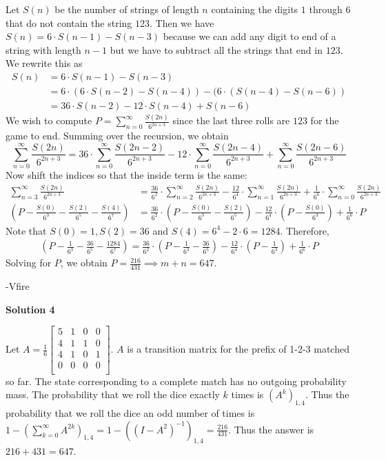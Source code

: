 \begin{enumerate}
Let $S(n)$ be the number of strings of length $n$ containing the digits $1$ through $6$ that do not contain the string $123$. Then we have $S(n) = 6 \cdot S(n-1) - S(n-3)$ because we can add any digit to end of a string with length $n-1$ but we have to subtract all the strings that end in $123$. We rewrite this as
 \begin{align*} S(n) &= 6 \cdot S(n-1) - S(n-3) \\ &= 6 \cdot (6 \cdot S(n-2) - S(n-4)) - (6 \cdot (S(n-4) - S(n-6)) \\ &= 36 \cdot S(n-2) - 12 \cdot S(n-4) + S(n-6) \end{align*}
 We wish to compute $P=\sum_{n=0}^\infty \frac{S(2n)}{6^{2n+3}}$ since the last three rolls are $123$ for the game to end. Summing over the recursion, we obtain
 \[\sum_{n=0}^\infty \frac{S(2n)}{6^{2n+3}} =36 \cdot \sum_{n=0}^\infty \frac{S(2n-2)}{6^{2n+3}} - 12 \cdot  \sum_{n=0}^\infty \frac{S(2n-4)}{6^{2n+3}}+ \sum_{n=0}^\infty \frac{S(2n-6)}{6^{2n+3}}\]Now shift the indices so that the inside term is the same:
 \begin{align*} \sum_{n=3}^\infty  \frac{S(2n)}{6^{2n+3}} &= \frac{36}{6^2} \cdot \sum_{n=2}^\infty \frac{S(2n)}{6^{2n+3}} - \frac{12}{6^4} \cdot \sum_{n=1}^\infty \frac{S(2n)}{6^{2n+3}} + \frac{1}{6^6} \cdot \sum_{n=0}^\infty \frac{S(2n)}{6^{2n+3}}  \\  \left(P - \frac{S(0)}{6^3} -  \frac{S(2)}{6^5} -\frac{S(4)}{6^7}  \right) &= \frac{36}{6^2} \cdot \left( P -   \frac{S(0)}{6^3} -  \frac{S(2)}{6^5}\right) - \frac{12}{6^4} \cdot \left(  P - \frac{S(0)}{6^3} \right) + \frac{1}{6^6} \cdot P  \end{align*}
Note that $S(0) = 1, S(2) = 36$ and $S(4) = 6^4 - 2 \cdot 6 = 1284$. Therefore,
 \begin{align*} \left(P - \frac{1}{6^3} -  \frac{36}{6^5} -\frac{1284}{6^7}  \right) = \frac{36}{6^2} \cdot \left( P -   \frac{1}{6^3} -  \frac{36}{6^5}\right) - \frac{12}{6^4} \cdot \left(  P - \frac{1}{6^3} \right) + \frac{1}{6^6} \cdot P   \end{align*}
Solving for $P$, we obtain $P = \frac{216}{431} \implies m+n = \boxed{647}$. 

 -Vfire

 



\textbf{Solution 4}

Let $A=\frac{1}{6} \begin{bmatrix} 5 & 1 & 0 & 0 \\ 4 & 1 & 1 & 0 \\ 4 & 1 & 0 & 1 \\ 0 & 0 & 0 & 0 \\ \end{bmatrix}$. $A$ is a transition matrix for the prefix of 1-2-3 matched so far. The state corresponding to a complete match has no outgoing probability mass. The probability that we roll the dice exactly $k$ times is $(A^k)_{1,4}$. Thus the probability that we roll the dice an odd number of times is $1-\left(\sum_{k=0}^\infty A^{2k}\right)_{1,4} = 1-\left((I - A^2)^{-1}\right)_{1,4} = \frac{216}{431}$. Thus the answer is $216+431=\boxed{647}$.


\end{enumerate}
